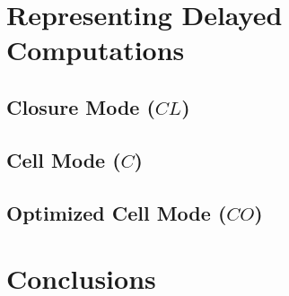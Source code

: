 \documentclass[11pt]{article}
\begin{document}
\section{Representing Delayed Computations}\label{sec:RepresentingDelayedComputation}

\subsection{Closure Mode ($CL$)}\label{sec:ClosureMode}

\subsection{Cell Mode ($C$)}\label{sec:CellMode}

\subsection{Optimized Cell Mode ($CO$)}\label{sec:OptCellMode}

\section{Conclusions}\label{sec:Conclusions}



\end{document}
